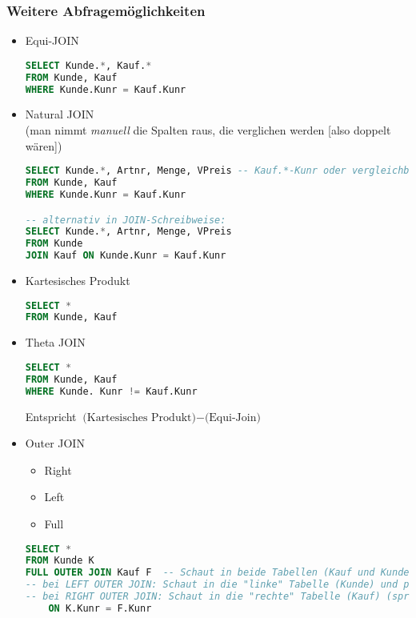 \subsubsection{Weitere Abfragemöglichkeiten}
\begin{itemize}
\item Equi-JOIN
\begin{lstlisting}[language=SQL]
SELECT Kunde.*, Kauf.*
FROM Kunde, Kauf
WHERE Kunde.Kunr = Kauf.Kunr
\end{lstlisting}
\item Natural JOIN\\
(man nimmt \emph{manuell} die Spalten raus, die verglichen werden [also doppelt wären])
\begin{lstlisting}[language=SQL]
SELECT Kunde.*, Artnr, Menge, VPreis -- Kauf.*-Kunr oder vergleichbares nicht möglich! Es müssen alle Spalten manuell angegeben werden
FROM Kunde, Kauf
WHERE Kunde.Kunr = Kauf.Kunr

-- alternativ in JOIN-Schreibweise:
SELECT Kunde.*, Artnr, Menge, VPreis
FROM Kunde
JOIN Kauf ON Kunde.Kunr = Kauf.Kunr
\end{lstlisting}
\item Kartesisches Produkt
\begin{lstlisting}[language=SQL]
SELECT *
FROM Kunde, Kauf
\end{lstlisting}
\item Theta JOIN
\begin{lstlisting}[language=SQL]
SELECT *
FROM Kunde, Kauf
WHERE Kunde. Kunr != Kauf.Kunr
\end{lstlisting}
Entspricht $\text{(Kartesisches Produkt)}-\text{(Equi-Join)}$
\item Outer JOIN
\begin{itemize}
\item Right
\item Left
\item Full
\end{itemize}
\begin{lstlisting}[language=SQL]
SELECT *
FROM Kunde K
FULL OUTER JOIN Kauf F	-- Schaut in beide Tabellen (Kauf und Kunde) und fügt die hinzu, die keinen Zusammenhang haben
-- bei LEFT OUTER JOIN: Schaut in die "linke" Tabelle (Kunde) und prüft, welche im Zusammenhang mit Kauf nicht auftauchen (sprich: welcher Kunde nichts gekauft hat)
-- bei RIGHT OUTER JOIN: Schaut in die "rechte" Tabelle (Kauf) (sprich: welcher Kauf keinen Kunden hat: nicht möglich)
	ON K.Kunr = F.Kunr
\end{lstlisting}
\end{itemize}
